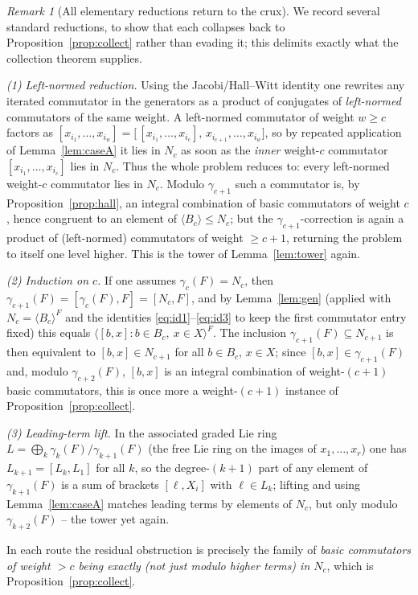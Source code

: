 \documentclass{amsart}
\theoremstyle{definition}
\theoremstyle{remark}
\newtheorem{remark}{Remark}
\begin{document}
\begin{remark}[All elementary reductions return to the crux]\label{rem:reductions}
We record several standard reductions, to show that each collapses back to
Proposition~\ref{prop:collect} rather than evading it; this delimits exactly what
the collection theorem supplies.

\smallskip
\emph{(1) Left-normed reduction.} Using the Jacobi/Hall--Witt identity one rewrites
any iterated commutator in the generators as a product of conjugates of
\emph{left-normed} commutators of the same weight. A left-normed commutator of
weight $w\ge c$ factors as
$[x_{i_1},\dots,x_{i_w}]=\big[\,[x_{i_1},\dots,x_{i_c}],\,x_{i_{c+1}},\dots,x_{i_w}\big]$,
so by repeated application of Lemma~\ref{lem:caseA} it lies in $N_c$ as soon as the
\emph{inner} weight-$c$ commutator $[x_{i_1},\dots,x_{i_c}]$ lies in $N_c$. Thus the
whole problem reduces to: every left-normed weight-$c$ commutator lies in $N_c$.
Modulo $\gamma_{c+1}$ such a commutator is, by Proposition~\ref{prop:hall}, an
integral combination of basic commutators of weight $c$, hence congruent to an
element of $\langle B_c\rangle\le N_c$; but the $\gamma_{c+1}$-correction is again a
product of (left-normed) commutators of weight $\ge c+1$, returning the problem to
itself one level higher. This is the tower of Lemma~\ref{lem:tower} again.

\smallskip
\emph{(2) Induction on $c$.} If one assumes $\gamma_c(F)=N_c$, then
$\gamma_{c+1}(F)=[\gamma_c(F),F]=[N_c,F]$, and by Lemma~\ref{lem:gen} (applied with
$N_c=\langle B_c\rangle^F$ and the identities \eqref{eq:id1}--\eqref{eq:id3} to keep
the first commutator entry fixed) this equals
$\big\langle [b,x] : b\in B_c,\ x\in X\big\rangle^{F}$. The inclusion
$\gamma_{c+1}(F)\subseteq N_{c+1}$ is then equivalent to $[b,x]\in N_{c+1}$ for all
$b\in B_c$, $x\in X$; since $[b,x]\in\gamma_{c+1}(F)$ and, modulo $\gamma_{c+2}(F)$,
$[b,x]$ is an integral combination of weight-$(c+1)$ basic commutators, this is once
more a weight-$(c+1)$ instance of Proposition~\ref{prop:collect}.

\smallskip
\emph{(3) Leading-term lift.} In the associated graded Lie ring
$L=\bigoplus_k\gamma_k(F)/\gamma_{k+1}(F)$ (the free Lie ring on the images of
$x_1,\dots,x_r$) one has $L_{k+1}=[L_k,L_1]$ for all $k$, so the degree-$(k+1)$ part
of any element of $\gamma_{k+1}(F)$ is a sum of brackets $[\ell,X_i]$ with
$\ell\in L_k$; lifting and using Lemma~\ref{lem:caseA} matches leading terms by
elements of $N_c$, but only modulo $\gamma_{k+2}(F)$ -- the tower yet again.

In each route the residual obstruction is precisely the family of
\emph{basic commutators of weight $>c$ being exactly (not just modulo higher terms)
in $N_c$}, which is Proposition~\ref{prop:collect}.
\end{remark}
\end{document}
